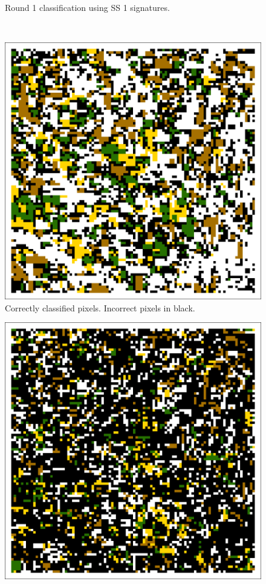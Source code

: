 \begin{ssfigure}
\begin{subfigure}[t]{.475\textwidth}
    \caption{Round 1 classification using SS 1 signatures.}
    \label{subfig:ss1r1class}
  \end{subfigure}
  \\
  \vspace{.25in}
  \begin{subfigure}[b]{.475\textwidth}
    \includegraphics[width=\textwidth]{Graphics/Testing/clip1_MODIS_round1_correct.pdf}
    \caption{Correctly classified pixels. Incorrect pixels in black.}
    \label{subfig:ss1r1correct}
  \end{subfigure}
  \quad
  \begin{subfigure}[b]{.475\textwidth}
    \includegraphics[width=\textwidth]{Graphics/Testing/clip1_MODIS_round1_incorrect.pdf}

\end{subfigure}
\end{ssfigure}
